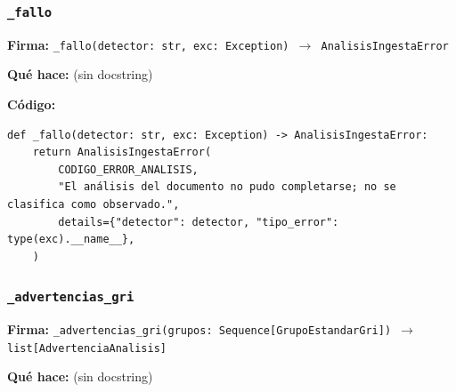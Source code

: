\documentclass[11pt,a4paper]{article}
\begin{document}
\subsubsection*{\texttt{\_fallo}}
\textbf{Firma:} \texttt{\_fallo(detector: str, exc: Exception) $\rightarrow$ AnalisisIngestaError}

\textbf{Qué hace:} (sin docstring)

\textbf{Código:}
\begin{lstlisting}
def _fallo(detector: str, exc: Exception) -> AnalisisIngestaError:
    return AnalisisIngestaError(
        CODIGO_ERROR_ANALISIS,
        "El análisis del documento no pudo completarse; no se clasifica como observado.",
        details={"detector": detector, "tipo_error": type(exc).__name__},
    )
\end{lstlisting}

\subsubsection*{\texttt{\_advertencias\_gri}}
\textbf{Firma:} \texttt{\_advertencias\_gri(grupos: Sequence[GrupoEstandarGri]) $\rightarrow$ list[AdvertenciaAnalisis]}

\textbf{Qué hace:} (sin docstring)
\end{document}

